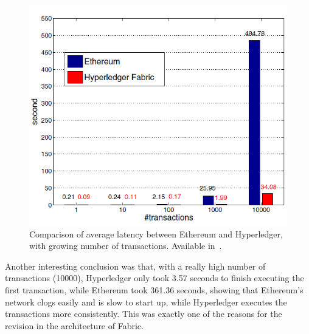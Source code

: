 \begin{figure}[h]
\centering
\includegraphics[scale=0.75]{media/average_latency_frameworks.png}
\caption[Comparison of average latency between Ethereum and Hyperledger, with growing number of transactions]{Comparison of average latency between Ethereum and Hyperledger, with growing number of transactions. Available in~\cite{Pongnumkul2017}.}
\label{fig:latency_comparison}
\end{figure}

Another interesting conclusion was that, with a really high number of transactions (10000), Hyperledger only took 3.57 seconds to finish executing the first transaction, while Ethereum took 361.36 seconds, showing that Ethereum's network clogs easily and is slow to start up, while Hyperledger executes the transactions more consistently. This was exactly one of the reasons for the revision in the architecture of Fabric.

